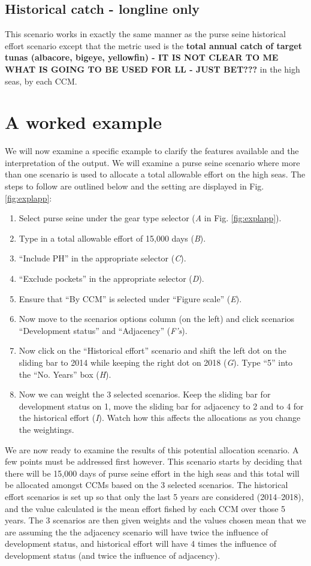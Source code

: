 \documentclass[11pt]{article}
\begin{document}
\subsection*{Historical catch - longline only}
This scenario works in exactly the same manner as the purse seine historical effort scenario except that the metric used is the {\bf total annual catch of target tunas (albacore, bigeye, yellowfin) - IT IS NOT CLEAR TO ME WHAT IS GOING TO BE USED FOR LL - JUST BET???} in the high seas, by each CCM.

\section{A worked example} \label{sec:expl}
We will now examine a specific example to clarify the features available and the interpretation of the output. We will examine a purse seine scenario where more than one scenario is used to allocate a total allowable effort on the high seas. The steps to follow are outlined below and the setting are displayed in Fig. \ref{fig:explapp}:
\begin{enumerate}
\item Select purse seine under the gear type selector ({\it A} in Fig. \ref{fig:explapp}).
\item Type in a total allowable effort of 15,000 days ({\it B}).
\item ``Include PH'' in the appropriate selector ({\it C}).
\item ``Exclude pockets'' in the appropriate selector ({\it D}).
\item Ensure that ``By CCM'' is selected under ``Figure scale'' ({\it E}).
\item Now move to the scenarios options column (on the left) and click scenarios ``Development status'' and ``Adjacency'' ({\it F's}).
\item Now click on the ``Historical effort'' scenario and shift the left dot on the sliding bar to 2014 while keeping the right dot on 2018 ({\it G}). Type ``5'' into the ``No. Years'' box ({\it H}).
\item Now we can weight the 3 selected scenarios. Keep the sliding bar for development status on 1, move the sliding bar for adjacency to 2 and to 4 for the historical effort ({\it I}). Watch how this affects the allocations as you change the weightings.
\end{enumerate}
We are now ready to examine the results of this potential allocation scenario. A few points must be addressed first however. This scenario starts by deciding that there will be 15,000 days of purse seine effort in the high seas and this total will be allocated amongst CCMs based on the 3 selected scenarios. The historical effort scenarios is set up so that only the last 5 years are considered (2014--2018), and the value calculated is the mean effort fished by each CCM over those 5 years. The 3 scenarios are then given weights and the values chosen mean that we are assuming the the adjacency scenario will have twice the influence of development status, and historical effort will have 4 times the influence of development status (and twice the influence of adjacency).
\end{document}
